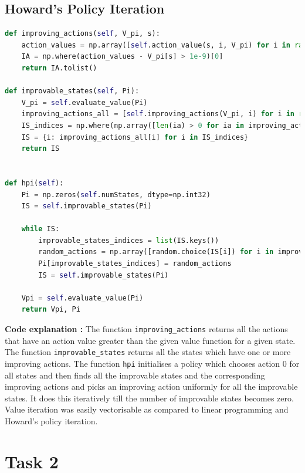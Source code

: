 \documentclass[11pt]{article}
\begin{document}
\subsection*{Howard's Policy Iteration}
 

 \begin{lstlisting}[language=Python]      
def improving_actions(self, V_pi, s):
    action_values = np.array([self.action_value(s, i, V_pi) for i in range(self.numActions)])
    IA = np.where(action_values - V_pi[s] > 1e-9)[0]
    return IA.tolist()

def improvable_states(self, Pi):
    V_pi = self.evaluate_value(Pi)
    improving_actions_all = [self.improving_actions(V_pi, i) for i in range(self.numStates)]
    IS_indices = np.where(np.array([len(ia) > 0 for ia in improving_actions_all]))[0]
    IS = {i: improving_actions_all[i] for i in IS_indices}
    return IS


def hpi(self):
    Pi = np.zeros(self.numStates, dtype=np.int32)
    IS = self.improvable_states(Pi)
    
    while IS:
        improvable_states_indices = list(IS.keys())
        random_actions = np.array([random.choice(IS[i]) for i in improvable_states_indices])
        Pi[improvable_states_indices] = random_actions
        IS = self.improvable_states(Pi)
    
    Vpi = self.evaluate_value(Pi)
    return Vpi, Pi      
\end{lstlisting}
\noindent
    \textbf{Code explanation :} The function \texttt{improving\_actions} returns all the actions
    that have an action value greater than the given value function for a given state. The function \texttt{improvable\_states}
    returns all the states which have one or more improving actions. The function \texttt{hpi}
    initialises a policy which chooses action 0 for all states and then finds all the improvable states and the corresponding improving
    actions and picks an improving action uniformly for all the improvable states. It does this
    iteratively till the number of improvable states becomes zero. 
    \\[2\baselineskip] Value iteration was easily vectorisable as compared to linear programming
    and Howard's policy iteration.
    \newpage
\section*{Task 2}
\end{document}
